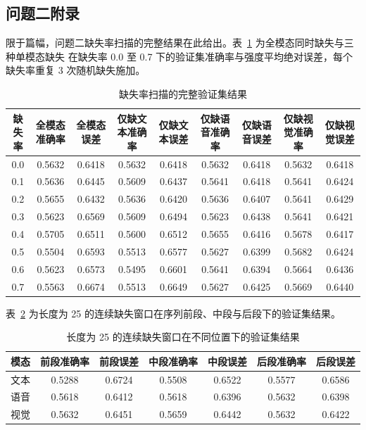 \documentclass[bwprint]{gmcmthesis}
\begin{document}
\clearpage
\label{appendix:start}
\begin{appendices}

\section{问题二附录}

限于篇幅，问题二缺失率扫描的完整结果在此给出。表~\ref{tab:app_rate} 为全模态同时缺失与三种单模态缺失
在缺失率 0.0 至 0.7 下的验证集准确率与强度平均绝对误差，每个缺失率重复 3 次随机缺失施加。

\begin{table}[htp!]
\centering
\caption{缺失率扫描的完整验证集结果}
\label{tab:app_rate}
\renewcommand\arraystretch{1.15}
\footnotesize
\setlength{\tabcolsep}{2.2pt}
\begin{tabular}{|c|c|c|c|c|c|c|c|c|}
\hline
缺失率 & 全模态准确率 & 全模态误差 & 仅缺文本准确率 & 仅缺文本误差 & 仅缺语音准确率 & 仅缺语音误差 & 仅缺视觉准确率 & 仅缺视觉误差 \\
\hline
0.0 & 0.5632 & 0.6418 & 0.5632 & 0.6418 & 0.5632 & 0.6418 & 0.5632 & 0.6418 \\
\hline
0.1 & 0.5636 & 0.6445 & 0.5609 & 0.6437 & 0.5641 & 0.6418 & 0.5641 & 0.6424 \\
\hline
0.2 & 0.5655 & 0.6432 & 0.5636 & 0.6420 & 0.5636 & 0.6407 & 0.5641 & 0.6429 \\
\hline
0.3 & 0.5623 & 0.6569 & 0.5609 & 0.6494 & 0.5623 & 0.6438 & 0.5641 & 0.6421 \\
\hline
0.4 & 0.5705 & 0.6511 & 0.5600 & 0.6512 & 0.5655 & 0.6416 & 0.5678 & 0.6417 \\
\hline
0.5 & 0.5504 & 0.6593 & 0.5513 & 0.6577 & 0.5627 & 0.6399 & 0.5682 & 0.6424 \\
\hline
0.6 & 0.5623 & 0.6573 & 0.5495 & 0.6601 & 0.5641 & 0.6394 & 0.5664 & 0.6436 \\
\hline
0.7 & 0.5563 & 0.6674 & 0.5513 & 0.6649 & 0.5627 & 0.6425 & 0.5669 & 0.6440 \\
\hline
\end{tabular}
\end{table}

表~\ref{tab:app_pos} 为长度为 25 的连续缺失窗口在序列前段、中段与后段下的验证集结果。

\begin{table}[htp!]
\centering
\caption{长度为 25 的连续缺失窗口在不同位置下的验证集结果}
\label{tab:app_pos}
\renewcommand\arraystretch{1.2}
\begin{tabular}{|c|c|c|c|c|c|c|}
\hline
模态 & 前段准确率 & 前段误差 & 中段准确率 & 中段误差 & 后段准确率 & 后段误差 \\
\hline
文本 & 0.5288 & 0.6724 & 0.5508 & 0.6522 & 0.5577 & 0.6586 \\
\hline
语音 & 0.5618 & 0.6412 & 0.5618 & 0.6396 & 0.5632 & 0.6398 \\
\hline
视觉 & 0.5632 & 0.6451 & 0.5659 & 0.6442 & 0.5632 & 0.6422 \\
\hline
\end{tabular}
\end{table}


\end{appendices}
\end{document}

